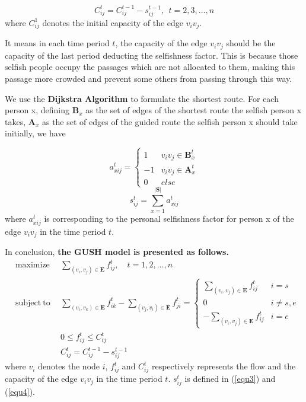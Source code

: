 \documentclass[a4paper,12pt]{article}
\begin{document}
\begin{equation}
\label{equ2}
C^t_{ij}=C^{t-1}_{ij}-s^{t-1}_{ij},\ \ t = 2,3,\ldots, n
\end{equation}
  where $C^1_{ij}$ denotes the initial capacity of the edge $v_iv_j$.

It means in each time period $t$, the capacity of the edge $v_iv_j$ should be the capacity of the last period deducting the selfishness factor. This is because those selfish people occupy the passages which are not allocated to them, making this passage more crowded and prevent some others from passing through this way.

We use the \textbf{Dijkstra Algorithm} to formulate the shortest route. For each person x, defining $\bm{B}_x$ as the set of edges of the shortest route the selfish person x takes, $\bm{A}_x$ as the set of edges of the guided route the selfish person x should take initially, we have

\begin{equation}
\label{equ3}
a^{t}_{xij}=\left\{\begin{matrix}
1 &v_iv_j\in \bm{B}^t_x \\ 
-1 & v_iv_j\in \bm{A}^t_x\\
0 & else
\end{matrix}\right.
\end{equation}
\begin{equation}
\label{equ4}
s^{t}_{ij}=\sum_{x=1}^{\left | \bm{S}  \right |} a^{t}_{xij}   
\end{equation}
where $a^t_{xij}$ is corresponding to the personal selfishness factor for person x of the edge $v_iv_j$ in the time period $t$.

In conclusion, \textbf{the GUSH model is presented as follows.}
\begin{eqnarray}
\label{equ5}
 & \textrm{maximize} &               \ \    \sum \limits_{(v_i,v_j)\in \bm{E}} f^t_{ij},\quad t=1, 2, \ldots,n \nonumber \\
 & \textrm{subject}\ \textrm{to} &    \ \   \sum_{(v_i,v_k) \in  \bm{E}}f^t_{ik} - \sum_{(v_j,v_i)\in  \bm{E}}f^t_{ji}= 
\left\{\begin{matrix}
\sum\limits_{(v_i,v_j) \in  \bm{E}}f^t_{ij} & i=s\\ 
0 & i \neq s,e\\ 
-\sum\limits_{(v_i,v_j) \in  \bm{E}}f^t_{ij} & i=e
\end{matrix}\right.\\
 &   &  \ \   0\leq f^t_{ij}\leq C^t_{ij} \nonumber \\
 &  & \ \ C^t_{ij}=C^{t-1}_{ij}-s^{t-1}_{ij} \nonumber
\end{eqnarray}
where $v_i$ denotes the node $i$,  $f^t_{ij}$ and $C^t_{ij}$ respectively represents the flow and the capacity of the edge $v_iv_j$ in the time period $t$. $s^{t}_{ij}$ is defined in (\ref{equ3}) and (\ref{equ4}).
\end{document}
